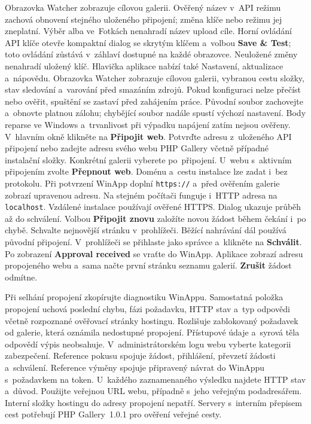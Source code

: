 \documentclass[11pt,a4paper]{article}
\newcommand{\ui}[1]{\textbf{#1}}
\begin{document}
Obrazovka Watcher zobrazuje cílovou galerii. Ověřený název v~API režimu
zachová obnovení stejného uloženého připojení; změna klíče nebo režimu jej
zneplatní. Výběr alba ve~Fotkách nenahradí název upload cíle.
Horní ovládání API klíče otevře
kompaktní dialog se skrytým klíčem a~volbou
\ui{Save \& Test}; toto ovládání zůstává v~záhlaví dostupné na každé
obrazovce. Neuložené změny nenahradí uložený klíč. Hlavička aplikace
nabízí také Nastavení, aktualizace a~nápovědu. Obrazovka Watcher zobrazuje
cílovou galerii, vybranou cestu složky, stav sledování a~varování před smazáním
zdrojů.
Pokud konfiguraci nelze přečíst nebo ověřit, spuštění se zastaví před zahájením
práce. Původní soubor zachovejte a~obnovte platnou zálohu; chybějící soubor
nadále spustí výchozí nastavení. Body reparse ve Windows a~trvanlivost při
výpadku napájení zatím nejsou ověřeny.
V~hlavním okně klikněte na \ui{Připojit web}. Potvrďte adresu z~uloženého
API připojení nebo zadejte adresu svého webu PHP Gallery včetně případné
instalační složky. Konkrétní galerii vyberete po~připojení.
U~webu s~aktivním připojením zvolte \ui{Přepnout web}.
Doménu a~cestu instalace lze zadat i~bez protokolu. Při potvrzení WinApp
doplní \texttt{https://} a~před ověřením galerie zobrazí upravenou adresu.
Na stejném počítači funguje i~HTTP adresa na \texttt{localhost}.
Vzdálené instalace používají ověřené HTTPS. Dialog ukazuje
průběh až do schválení. Volbou \ui{Připojit znovu} založíte novou žádost
během čekání i~po chybě. Schvalte nejnovější stránku v~prohlížeči.
Běžící nahrávání dál používá původní připojení.
V~prohlížeči se přihlaste jako správce a~klikněte na \ui{Schválit}.
Po zobrazení \ui{Approval received} se vraťte do WinApp. Aplikace zobrazí
adresu propojeného webu a~sama načte první stránku seznamu galerií.
\ui{Zrušit} žádost odmítne.

Při selhání propojení zkopírujte diagnostiku WinAppu. Samostatná položka
propojení uchová poslední chybu, fázi požadavku, HTTP stav a~typ odpovědi
včetně rozpoznané ověřovací stránky hostingu. Rozlišuje zablokovaný požadavek
od galerie, která oznámila nedostupné propojení. Přístupové údaje a~syrová
těla odpovědí výpis neobsahuje.
V~administrátorském logu webu vyberte kategorii zabezpečení. Reference
pokusu spojuje žádost, přihlášení, převzetí žádosti a~schválení.
Reference výměny spojuje připravený návrat do WinAppu s~požadavkem
na token. U~každého zaznamenaného výsledku najdete HTTP stav a~důvod.
Použijte veřejnou URL webu, případně s~jeho veřejným podadresářem.
Interní složky hostingu do adresy propojení nepatří. Servery s~interním
přepisem cest potřebují PHP Gallery~1.0.1 pro ověření veřejné cesty.
\end{document}
